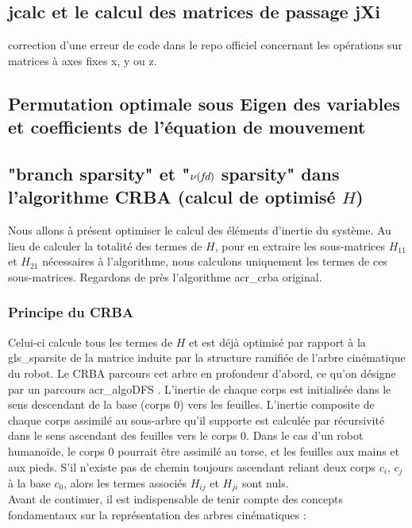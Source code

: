 \documentclass{report}
\begin{document}

\subsection{jcalc et le calcul des matrices de passage jXi}
correction d'une erreur de code dans le repo officiel concernant les opérations sur matrices à axes fixes x, y ou z.

\subsection{Permutation optimale sous Eigen des variables et coefficients de l'équation de mouvement}


\subsection{"branch sparsity" et "$\nu(\emph{fd})$ sparsity" dans l'algorithme CRBA (calcul de optimisé $H$)}

Nous allons à présent optimiser le calcul des éléments d'inertie du système. Au lieu de calculer la totalité des termes de $H$, pour en extraire les sous-matrices $H_{11}$ et $H_{21}$ nécessaires à l'algorithme, nous calculons uniquement les termes de ces sous-matrices. Regardons de près l'algorithme \gls{acr_crba} original.\\

\subsubsection{Principe du CRBA}
Celui-ci calcule tous les termes de $H$ et est déjà optimisé par rapport à la \gls{gls_sparsite} de la matrice induite par la structure ramifiée de l'arbre cinématique du robot. Le CRBA parcours cet arbre en profondeur d'abord, ce qu'on désigne par un parcours \gls{acr_algoDFS} \cite{bib_deepFirstSearch}. L'inertie de chaque corps est initialisée dans le sens descendant de la base (corps 0) vers les feuilles. L'inertie composite de chaque corps assimilé au sous-arbre qu'il supporte est calculée par récursivité dans le sens ascendant des feuilles vers le corps 0. Dans le cas d'un robot humanoïde, le corps 0 pourrait être assimilé au torse, et les feuilles aux mains et aux pieds. S'il n'existe pas de chemin toujours ascendant reliant deux corps $c_i$, $c_j$ à la base $c_0$, alors les termes associés $H_{ij}$ et $H_{ji}$ sont nuls.\\
Avant de continuer, il est indispensable de tenir compte des concepts fondamentaux sur la représentation des arbres cinématiques \cite{ch_algSpa_equationMouvement}:
\end{document}
